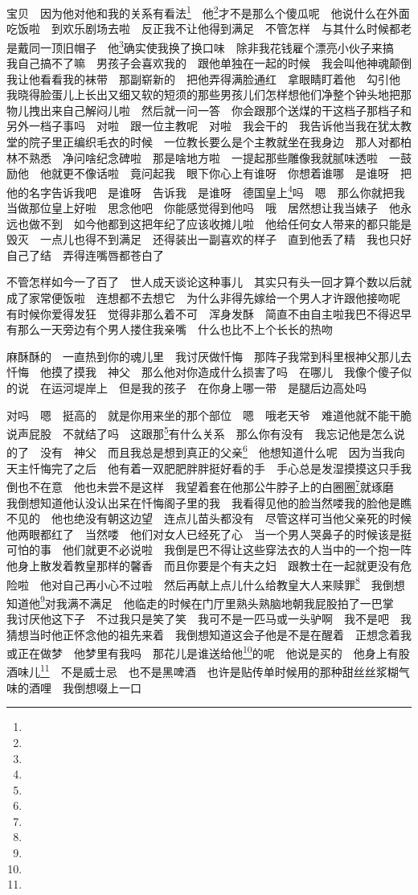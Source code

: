 \par 宝贝　因为他对他和我的关系有看法\footnote{}　他\footnote{}才不是那么个傻瓜呢　他说什么在外面吃饭啦　到欢乐剧场去啦　反正我不让他得到满足　不管怎样　与其什么时候都老是戴同一顶旧帽子　他\footnote{}确实使我换了换口味　除非我花钱雇个漂亮小伙子来搞　我自己搞不了嘛　男孩子会喜欢我的　跟他单独在一起的时候　我会叫他神魂颠倒　我让他看看我的袜带　那副崭新的　把他弄得满脸通红　拿眼睛盯着他　勾引他　我晓得脸蛋儿上长出又细又软的短须的那些男孩儿们怎样想他们净整个钟头地把那物儿拽出来自己解闷儿啦　然后就一问一答　你会跟那个送煤的干这档子那档子和另外一档子事吗　对啦　跟一位主教呢　对啦　我会干的　我告诉他当我在犹太教堂的院子里正编织毛衣的时候　一位教长要么是个主教就坐在我身边　那人对都柏林不熟悉　净问啥纪念碑啦　那是啥地方啦　一提起那些雕像我就腻味透啦　一鼓励他　他就更不像话啦　竟问起我　眼下你心上有谁呀　你想着谁哪　是谁呀　把他的名字告诉我吧　是谁呀　告诉我　是谁呀　德国皇上\footnote{}吗　嗯　那么你就把我当做那位皇上好啦　思念他吧　你能感觉得到他吗　哦　居然想让我当婊子　他永远也做不到　如今他都到这把年纪了应该收摊儿啦　他给任何女人带来的都只能是毁灭　一点儿也得不到满足　还得装出一副喜欢的样子　直到他丢了精　我也只好自己了结　弄得连嘴唇都苍白了　
\par 不管怎样如今一了百了　世人成天谈论这种事儿　其实只有头一回才算个数以后就成了家常便饭啦　连想都不去想它　为什么非得先嫁给一个男人才许跟他接吻呢　有时候你爱得发狂　觉得非那么着不可　浑身发酥　简直不由自主啦我巴不得迟早有那么一天旁边有个男人搂住我亲嘴　什么也比不上个长长的热吻　
\par 麻酥酥的　一直热到你的魂儿里　我讨厌做忏悔　那阵子我常到科里根神父那儿去忏悔　他摸了摸我　神父　那么他对你造成什么损害了吗　在哪儿　我像个傻子似的说　在运河堤岸上　但是我的孩子　在你身上哪一带　是腿后边高处吗　
\par 对吗　嗯　挺高的　就是你用来坐的那个部位　嗯　哦老天爷　难道他就不能干脆说声屁股　不就结了吗　这跟那\footnote{}有什么关系　那么你有没有　我忘记他是怎么说的了　没有　神父　而且我总是想到真正的父亲\footnote{}　他想知道什么呢　因为当我向天主忏悔完了之后　他有着一双肥肥胖胖挺好看的手　手心总是发湿摸摸这只手我倒也不在意　他也未尝不是这样　我望着套在他那公牛脖子上的白圈圈\footnote{}就琢磨　我倒想知道他认没认出呆在忏悔阁子里的我　我看得见他的脸当然喽我的脸他是瞧不见的　他也绝没有朝这边望　连点儿苗头都没有　尽管这样可当他父亲死的时候他两眼都红了　当然喽　他们对女人已经死了心　当一个男人哭鼻子的时候该是挺可怕的事　他们就更不必说啦　我倒是巴不得让这些穿法衣的人当中的一个抱一阵　他身上散发着教皇那样的馨香　而且你要是个有夫之妇　跟教士在一起就更没有危险啦　他对自己再小心不过啦　然后再献上点儿什么给教皇大人来赎罪\footnote{}　我倒想知道他\footnote{}对我满不满足　他临走的时候在门厅里熟头熟脑地朝我屁股拍了一巴掌　我讨厌他这下子　不过我只是笑了笑　我可不是一匹马或一头驴啊　我不是吧　我猜想当时他正怀念他的祖先来着　我倒想知道这会子他是不是在醒着　正想念着我　或正在做梦　他梦里有我吗　那花儿是谁送给他\footnote{}的呢　他说是买的　他身上有股酒味儿\footnote{}　不是威士忌　也不是黑啤酒　也许是贴传单时候用的那种甜丝丝浆糊气味的酒哩　我倒想啜上一口　
